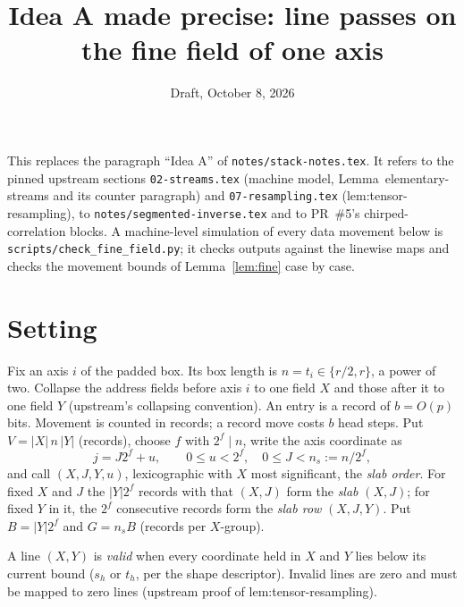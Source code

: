 \documentclass[11pt]{article}
\title{Idea A made precise: line passes on the fine field of one axis}
\date{Draft, October 8, 2026}
\theoremstyle{definition}\newtheorem{definition}{Definition}
\theoremstyle{remark}\newtheorem*{remark}{Remark}
\begin{document}
\maketitle

This replaces the paragraph ``Idea A'' of \texttt{notes/stack-notes.tex}. It refers to the
pinned upstream sections \texttt{02-streams.tex} (machine model,
Lemma~elementary-streams and its counter paragraph) and \texttt{07-resampling.tex}
(lem:tensor-resampling), to \texttt{notes/segmented-inverse.tex} and to PR~\#5's
chirped-correlation blocks. A machine-level simulation of every data movement below is
\texttt{scripts/check\_fine\_field.py}; it checks outputs against the linewise maps
and checks the movement bounds of Lemma~\ref{lem:fine} case by case.

\section{Setting}

Fix an axis $i$ of the padded box. Its box length is $n=t_i\in\{r/2,r\}$, a power of two.
Collapse the address fields before axis $i$ to one field $X$ and those after it to one
field $Y$ (upstream's collapsing convention). An entry is a record of $b=O(p)$ bits.
Movement is counted in records; a record move costs $b$ head steps. Put
$V=|X|\,n\,|Y|$ (records), choose $f$ with $2^f\mid n$, write the axis coordinate as
\[ j=J2^f+u,\qquad 0\le u<2^f,\quad 0\le J<n_s:=n/2^f, \]
and call $(X,J,Y,u)$, lexicographic with $X$ most significant, the \emph{slab order}. For
fixed $X$ and $J$ the $|Y|2^f$ records with that $(X,J)$ form the \emph{slab} $(X,J)$; for
fixed $Y$ in it, the $2^f$ consecutive records form the \emph{slab row} $(X,J,Y)$. Put
$B=|Y|2^f$ and $G=n_sB$ (records per $X$-group).

A line $(X,Y)$ is \emph{valid} when every coordinate held in $X$ and $Y$ lies below its
current bound ($s_h$ or $t_h$, per the shape descriptor). Invalid lines are zero and must be
mapped to zero lines (upstream proof of lem:tensor-resampling).
\end{document}
